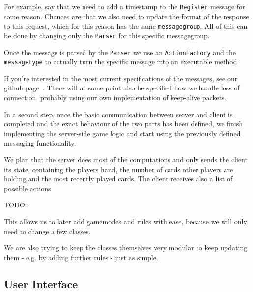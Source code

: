 \documentclass{report}
\begin{document}
For example, say that we need to add a timestamp to the \verb|Register| message for some reason. Chances are that we also need to update the format of the response to this request, which for this reason has the same \verb|messagegroup|. All of this can be done by changing only the \verb|Parser| for this specific messagegroup.

Once the message is parsed by the \verb|Parser| we use an \verb|ActionFactory| and the \verb|messagetype| to actually turn the specific message into an executable method.

If you're interested in the most current specifications of the messages, see our github page~\cite{github}. There will at some point also be specified how we handle loss of connection, probably using our own implementation of keep-alive packets.

In a second step, once the basic communication between server and client is completed and the exact behaviour of the two parts has been defined, we finish implementing the server-side game logic and start using the previously defined messaging functionality.

We plan that the server does most of the computations and only sends the client its state, containing the players hand, the number of cards other players are holding and the most recently played cards. The client receives also a list of possible actions


TODO::


This allows us to later add gamemodes and rules with ease, because we will only need to change a few classes.

We are also trying to keep the classes themselves very modular to keep updating them - e.g. by adding further rules - just as simple.

\subsection{User Interface}
\end{document}
